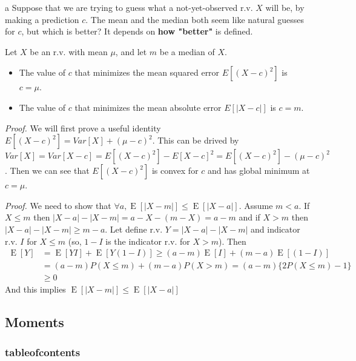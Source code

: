 \documentclass[8pt]{beamer}
\newcommand{\tb}[1]{\textbf{#1}}
\newcommand{\abs}[1]{\left\lvert #1 \right\rvert}
\newcommand{\expec}[1]{\operatorname{E}\left[ #1 \right]}
\begin{document}
\begin{frame}{a}
    Suppose that we are trying to guess what a not-yet-observed r.v. $X$ will be, by making a prediction $c$. The mean and the median both seem like natural guesses for $c$, but which is better? It depends on \tb{how "better"} is defined.

    \begin{theorem}
        Let $X$ be an r.v. with mean $\mu$, and let $m$ be a median of $X$.
        \begin{itemize}
            \item The value of $c$ that minimizes the mean squared error $E[(X-c)^2]$ is $c=\mu$.
            \item The value of $c$ that minimizes the mean absolute error $E[\vert X-c \vert]$ is $c=m$.
        \end{itemize}
    \end{theorem}

    \textit{Proof.} We will first prove a useful identity $E[(X-c)^2] = Var[X] + (\mu -c)^2$. This can be drived by $Var[X] = Var[X-c] = E[(X-c)^2] - E[X-c]^2 = E[(X-c)^2] - (\mu - c)^2$. Then we can see that $E[(X-c)^2]$ is convex for $c$ and has global minimum at $c = \mu$.

    \bigskip
    \textit{Proof.} We need to show that $\forall a, \expec{\abs{X-m}} \leq \expec{\abs{X-a}}$.
    Assume $m < a$. If $X \leq m$ then $\abs{X -a} - \abs{X - m} = a - X - (m - X) = a -m$ and if $X > m$ then $\abs{X-a} - \abs{X-m} \geq m - a$. Let define r.v. $Y = \abs{X-a} - \abs{X-m}$ and indicator r.v. $I$ for $X \leq m$ (so, $1-I$ is the indicator r.v. for $X>m$). Then
    \[
    \begin{aligned}
        \expec{Y} &= \expec{YI} + \expec{Y(1-I)} \geq (a-m)\expec{I} + (m-a)\expec{(1-I)} \\
        &= (a-m)P(X\leq m) + (m-a)P(X > m) = (a-m)\{2P(X\leq m) - 1\} \\
        &\geq 0
    \end{aligned}
    \]
    And this implies $\expec{\abs{X-m}}\leq \expec{\abs{X-a}}$

\end{frame}

\subsection{Moments}

\begin{frame}
    \frametitle{tableofcontents}
    \tableofcontents[currentsubsection]
\end{frame}
\end{document}
